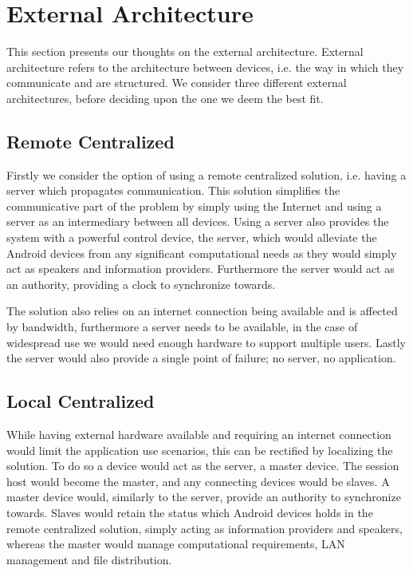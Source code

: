 \section{External Architecture}
This section presents our thoughts on the external architecture.
External architecture refers to the architecture between devices, i.e. the way in which they communicate and are structured.
We consider three different external architectures, before deciding upon the one we deem the best fit.

\subsection{Remote Centralized}
Firstly we consider the option of using a remote centralized solution, i.e. having a server which propagates communication.
This solution simplifies the communicative part of the problem by simply using the Internet and using a server as an intermediary between all devices.
Using a server also provides the system with a powerful control device, the server, which would alleviate the Android devices from any significant computational needs as they would simply act as speakers and information providers.
Furthermore the server would act as an authority, providing a clock to synchronize towards.

The solution also relies on an internet connection being available and is affected by bandwidth, furthermore a server needs to be available, in the case of widespread use we would need enough hardware to support multiple users. 
Lastly the server would also provide a single point of failure; no server, no application.

\subsection{Local Centralized}
While having external hardware available and requiring an internet connection would limit the application use scenarios, this can be rectified by localizing the solution.
To do so a device would act as the server, a master device.
The session host would become the master, and any connecting devices would be slaves.
A master device would, similarly to the server, provide an authority to synchronize towards.
Slaves would retain the status which Android devices holds in the remote centralized solution, simply acting as information providers and speakers, whereas the master would manage computational requirements, LAN management and file distribution.

